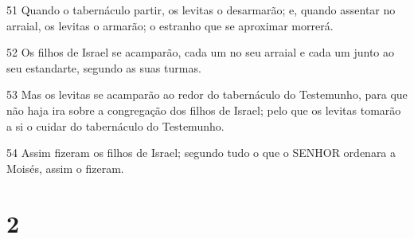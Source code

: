 \par 51 Quando o tabernáculo partir, os levitas o desarmarão; e, quando assentar no arraial, os levitas o armarão; o estranho que se aproximar morrerá.
\par 52 Os filhos de Israel se acamparão, cada um no seu arraial e cada um junto ao seu estandarte, segundo as suas turmas.
\par 53 Mas os levitas se acamparão ao redor do tabernáculo do Testemunho, para que não haja ira sobre a congregação dos filhos de Israel; pelo que os levitas tomarão a si o cuidar do tabernáculo do Testemunho.
\par 54 Assim fizeram os filhos de Israel; segundo tudo o que o SENHOR ordenara a Moisés, assim o fizeram.

\chapter{2}

